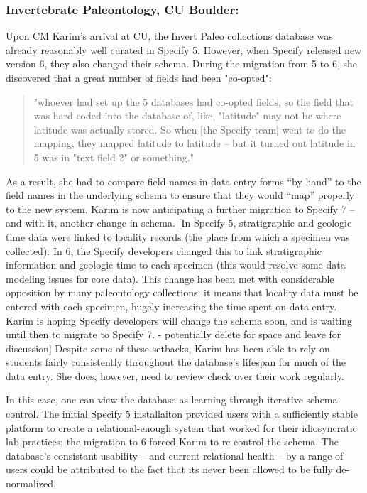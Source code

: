 \subsubsection{Invertebrate Paleontology, CU Boulder:}

Upon CM Karim's arrival at CU, the Invert Paleo collections database was already reasonably well curated in Specify 5.  However, when Specify released new version 6, they also changed their schema. During the migration from 5 to 6, she discovered that a great number of fields had been "co-opted":
\begin{quote}
"whoever had set up the 5 databases had co-opted fields, so the field that was hard coded into the database of, like, "latitude" may not be where latitude was actually stored.  So when [the Specify team] went to do the mapping, they mapped latitude to latitude -- but it turned out latitude in 5 was in "text field 2" or something." 
\end{quote}
As a result, she had to compare field names in data entry forms “by hand” to the field names in the underlying schema to ensure that they would “map” properly to the new system. Karim is now anticipating a further migration to Specify 7 – and with it, another change in schema. [In Specify 5, stratigraphic and geologic time data were linked to locality records (the place from which a specimen was collected). In 6, the Specify developers changed this to link stratigraphic information and geologic time to each specimen (this would resolve some data modeling issues for core data). This change has been met with considerable opposition by many paleontology collections; it means that locality data must be entered with each specimen, hugely increasing the time spent on data entry. Karim is hoping Specify developers will change the schema soon, and is waiting until then to migrate to Specify 7. - potentially delete for space and leave for discussion] Despite some of these setbacks, Karim has been able to rely on students fairly consistently throughout the database's lifespan for much of the data entry. She does, however, need to review check over their work regularly.

In this case, one can view the database as learning through iterative schema control. The initial Specify 5 installaiton provided users with a sufficiently stable platform to create a relational-enough system that worked for their idiosyncratic lab practices; the migration to 6 forced Karim to re-control the schema.  The database's consistant usability -- and current relational health -- by a range of users could be attributed to the fact that its never been allowed to be fully de-normalized.


